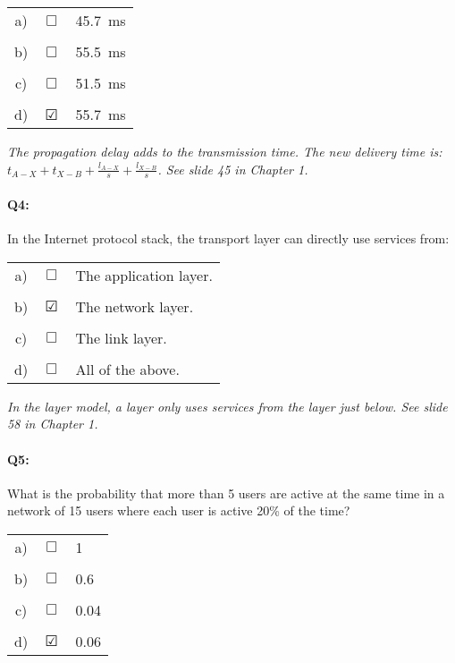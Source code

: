 \documentclass{llncs}
\newcommand{\answer}[1]{{\color{red}\textit{#1}\color{black}}}
\begin{document}
\begin{tabular}{ccl}
  a) & $\Box$ & 45.7~ms\\
  \\
  b) & $\Box$ & 55.5~ms \\
  \\
  c) & $\Box$ & 51.5~ms\\
  \\
  d) & $\CheckedBox$ & 55.7~ms
\end{tabular}


\answer{The propagation delay adds to the transmission time. The new delivery time is: $t_{A-X}+t_{X-B}+\frac{l_{A-X}}{s}+\frac{l_{X-B}}{s}$.
See slide 45 in Chapter 1. 
}

\paragraph{\textbf{Q4:}} In the Internet protocol stack, the transport layer can directly use services from:\\

\begin{tabular}{ccl}
  a) & $\Box$ & The application layer.\\
  \\
  b) & $\CheckedBox$ & The network layer.\\
  \\
  c) & $\Box$ & The link layer.\\
  \\
  d) & $\Box$ & All of the above.
\end{tabular}

\answer{In the layer model, a layer only uses services from the layer just below. See slide 58 in Chapter 1. }

\paragraph{\textbf{Q5:}} What is the probability that more than 5 users are active at the same time in a network of 15 users where each user is active 20\% of the time?\\

\begin{tabular}{ccl}
  a) & $\Box$ & 1\\
  \\
  b) & $\Box$ & 0.6\\
  \\
  c) & $\Box$ & 0.04\\
  \\
  d) & $\CheckedBox$ & 0.06
\end{tabular}
\end{document}
